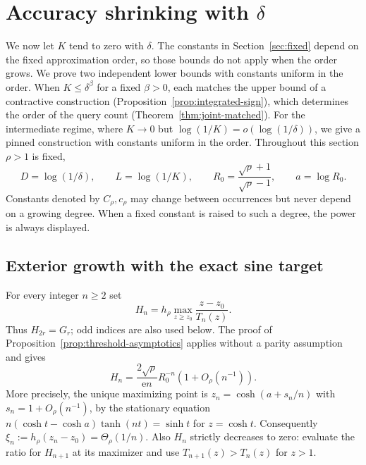 \section{Accuracy shrinking with $\delta$}\label{sec:joint}
We now let $K$ tend to zero with $\delta$. The constants in Section~\ref{sec:fixed} depend on the fixed approximation order, so those bounds do not apply when the order grows. We prove two independent lower bounds with constants uniform in the order. When $K\leq\delta^\beta$ for a fixed $\beta>0$, each matches the upper bound of a contractive construction (Proposition~\ref{prop:integrated-sign}), which determines the order of the query count (Theorem~\ref{thm:joint-matched}). For the intermediate regime, where $K\to0$ but $\log(1/K)=o(\log(1/\delta))$, we give a pinned construction with constants uniform in the order. Throughout this section $\rho>1$ is fixed,
\[
 D=\log(1/\delta),\qquad L=\log(1/K),\qquad
 R_0=\frac{\sqrt\rho+1}{\sqrt\rho-1},\qquad a=\log R_0.
\]
Constants denoted by $C_\rho,c_\rho$ may change between occurrences but never depend on a growing degree. When a fixed constant is raised to such a degree, the power is always displayed.

\subsection{Exterior growth with the exact sine target}
For every integer $n\geq2$ set
\begin{equation}\label{eq:Hn}
 H_n=h_\rho\max_{z\geq z_0}\frac{z-z_0}{T_n(z)}.
\end{equation}
Thus $H_{2r}=G_r$; odd indices are also used below. The proof of Proposition~\ref{prop:threshold-asymptotics} applies without a parity assumption and gives
\begin{equation}\label{eq:H-asymptotic}
 H_n=\frac{2\sqrt\rho}{\mathrm e n}R_0^{-n}(1+O_\rho(n^{-1})).
\end{equation}
More precisely, the unique maximizing point is $z_n=\cosh(a+s_n/n)$ with $s_n=1+O_\rho(n^{-1})$, by the stationary equation
$n(\cosh t-\cosh a)\tanh(nt)=\sinh t$ for $z=\cosh t$.
Consequently $\xi_n:=h_\rho(z_n-z_0)=\Theta_\rho(1/n)$. Also $H_n$ strictly decreases to zero: evaluate the ratio for $H_{n+1}$ at its maximizer and use $T_{n+1}(z)>T_n(z)$ for $z>1$.

